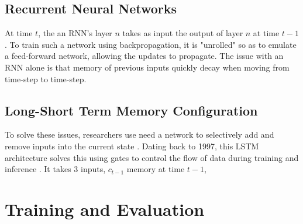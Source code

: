 \documentclass[12pt]{article}
\begin{document}
\subsection{Recurrent Neural Networks}

At time $t$, the an RNN's layer $n$ takes as input the output of layer $n$ at
time $t-1$. To train such a network using backpropagation, it is "unrolled" so
as to emulate a feed-forward network, allowing the updates to propagate. The
issue with an RNN alone is that memory of previous inputs quickly decay when
moving from time-step to time-step. 

\subsection{Long-Short Term Memory Configuration}

To solve these issues, researchers use need a network to selectively add and
remove inputs into the current state \parencite{zhang2019dive}. Dating back to
1997, this LSTM architecture solves this using gates to control the flow of data
during training and inference \parencite{zhang2019dive}. It takes 3 inputs,
$c_{t-1}$ memory at time $t-1$, %

\section{Training and Evaluation}
\end{document}
